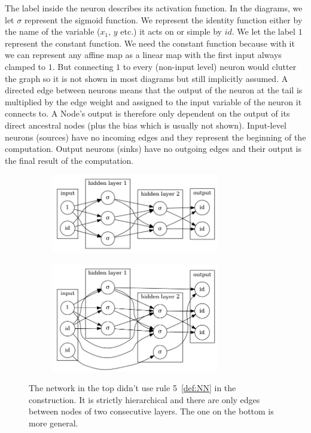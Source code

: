 \documentclass[11pt, a4paper]{report}
\theoremstyle{plain}
\theoremstyle{definition}
\theoremstyle{remark}
\begin{document}
The label inside the neuron describes its activation function. In the diagrams,
we let $\sigma$ represent the sigmoid function. We represent the identity
function either by the name of the variable ($x_1$, $y$ etc.) it acts on or
simple by $id$. We let the label $1$ represent the constant function. We need
the constant function because with it we can represent any affine map as a
linear map with the first input always clamped to $1$. But connecting $1$ to
every (non-input level) neuron would clutter the graph so it is not shown in
most diagrams but still implicitly assumed. A directed edge between neurons
means that the output of the neuron at the tail is multiplied by the edge weight
and assigned to the input variable of the neuron it connects to. A Node's output
is therefore only dependent on the output of its direct ancestral nodes (plus
the bias which is usually not shown). Input-level neurons (sources) have no
incoming edges and they represent the beginning of the computation. Output
neurons (sinks) have no outgoing edges and their output is the final result of
the computation.

\begin{figure}[h]
\centering
\begin{subfigure}[b]{0.5\textwidth}
\includegraphics[width=0.8\textwidth]{./plots/neuronlayers.gv.png}
\end{subfigure}
\begin{subfigure}[b]{0.5\textwidth}
\includegraphics[width=0.8\textwidth]{./plots/neuronlayers.2.gv.png}
\end{subfigure}
\caption{The network in the top didn't use rule 5~\ref{def:NN} in the construction.
It is strictly hierarchical and there are only edges between nodes of two
consecutive layers. The one on the bottom is more general.
}
\label{fig:nn1}
\end{figure}
\end{document}
